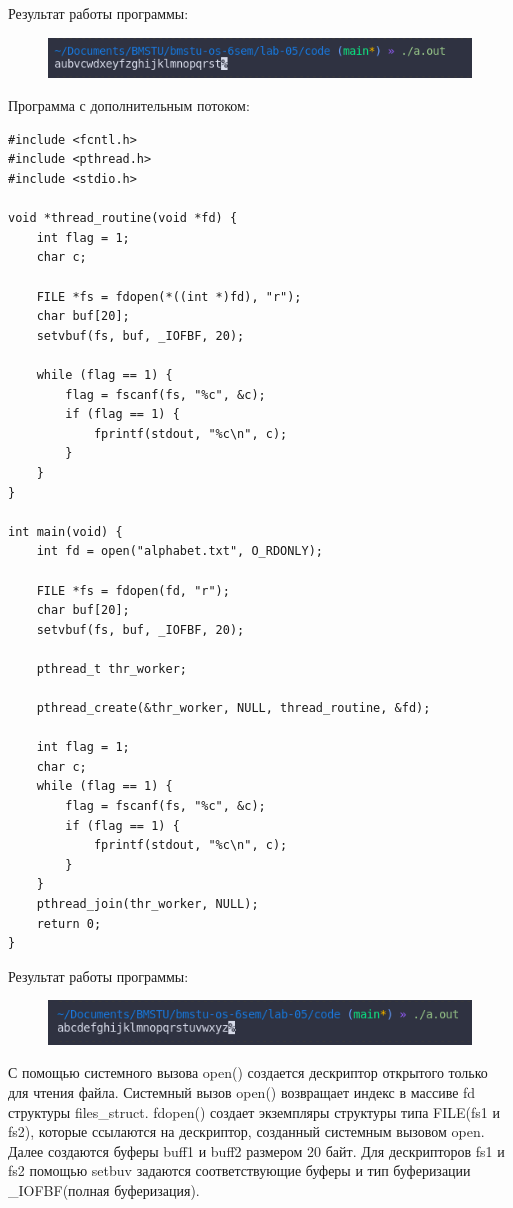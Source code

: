 Результат работы программы:
\begin{figure}[H]
	\centering
	\includegraphics[scale=0.8]{assets/p_1.png}
\end{figure}

Программа с дополнительным потоком:\newpage
\begin{lstlisting}
#include <fcntl.h>
#include <pthread.h>
#include <stdio.h>

void *thread_routine(void *fd) {
	int flag = 1;
	char c;
	
	FILE *fs = fdopen(*((int *)fd), "r");
	char buf[20];
	setvbuf(fs, buf, _IOFBF, 20);
	
	while (flag == 1) {
		flag = fscanf(fs, "%c", &c);
		if (flag == 1) {
			fprintf(stdout, "%c\n", c);
		}
	}
}

int main(void) {
	int fd = open("alphabet.txt", O_RDONLY);
	
	FILE *fs = fdopen(fd, "r");
	char buf[20];
	setvbuf(fs, buf, _IOFBF, 20);
	
	pthread_t thr_worker;
	
	pthread_create(&thr_worker, NULL, thread_routine, &fd);
	
	int flag = 1;
	char c;
	while (flag == 1) {
		flag = fscanf(fs, "%c", &c);
		if (flag == 1) {
			fprintf(stdout, "%c\n", c);
		}
	}
	pthread_join(thr_worker, NULL);
	return 0;
}
\end{lstlisting}

Результат работы программы:
\begin{figure}[H]
	\centering
	\includegraphics[scale=0.8]{assets/p_1_thread.png}
\end{figure}

С помощью системного вызова open() создается дескриптор открытого только для чтения файла. Системный вызов open() возвращает индекс в массиве fd структуры files\_struct. fdopen() создает экземпляры структуры типа FILE(fs1 и fs2), которые ссылаются на дескриптор, созданный системным вызовом open.
Далее создаются буферы  buff1 и buff2 размером 20 байт. Для дескрипторов fs1 и fs2 помощью setbuv задаются соответствующие буферы и тип буферизации \_IOFBF(полная буферизация).

